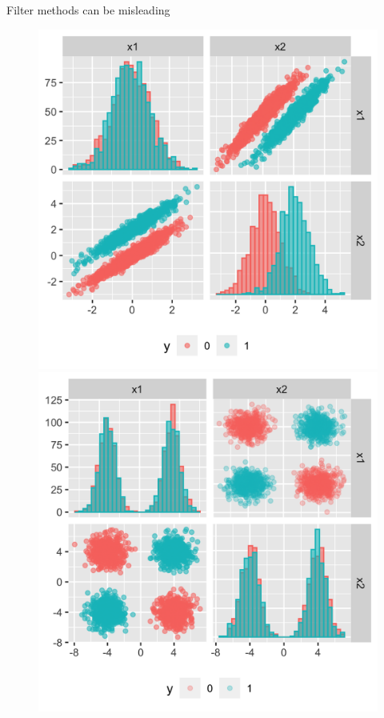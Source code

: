 \documentclass[11pt,compress,t,notes=noshow, xcolor=table]{beamer}
\begin{document}
\begin{vbframe}{Filter methods can be misleading}
     \begin{figure}
    \centering
    \begin{minipage}{0.45\textwidth}
        \centering
        \includegraphics[width=\textwidth]{figure/guyon_example_correlation.png} %
    \end{minipage}\hfill
    \begin{minipage}{0.45\textwidth}
        \centering
        \includegraphics[width=\textwidth]{figure/guyon_example_xor.png} %

\end{minipage}
\end{figure}
\end{vbframe}
\end{document}
